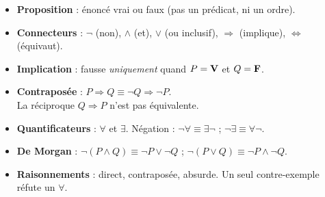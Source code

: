 \begin{bilan}
\begin{itemize}
  \item \textbf{Proposition} : \'enonc\'e vrai ou faux
        (pas un pr\'edicat, ni un ordre).
  \item \textbf{Connecteurs} :
        $\lnot$ (non), $\land$ (et), $\lor$ (ou inclusif),
        $\Rightarrow$ (implique), $\Leftrightarrow$ (\'equivaut).
  \item \textbf{Implication} : fausse \emph{uniquement} quand
        $P=\textbf{V}$ et $Q=\textbf{F}$.
  \item \textbf{Contrapos\'ee} : $P\Rightarrow Q\equiv\lnot Q\Rightarrow\lnot P$. \\
        La r\'eciproque $Q\Rightarrow P$ n'est pas \'equivalente.
  \item \textbf{Quantificateurs} : $\forall$ et $\exists$.
        N\'egation : $\lnot\forall \equiv \exists\lnot$ ;
        $\lnot\exists \equiv \forall\lnot$.
  \item \textbf{De Morgan} :
        $\lnot(P\land Q)\equiv\lnot P\lor\lnot Q$ ;
        $\lnot(P\lor Q)\equiv\lnot P\land\lnot Q$.
  \item \textbf{Raisonnements} : direct, contrapos\'ee, absurde.
        Un seul contre-exemple r\'efute un $\forall$.
\end{itemize}
\end{bilan}

